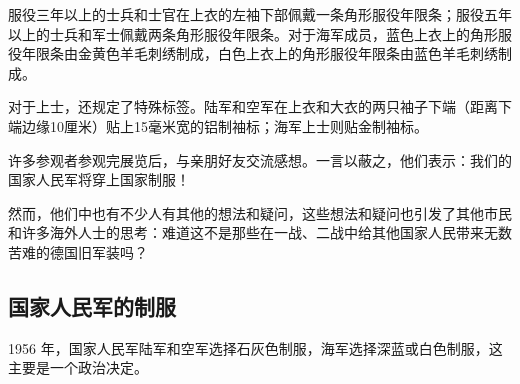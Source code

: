 服役三年以上的士兵和士官在上衣的左袖下部佩戴一条角形服役年限条；服役五年以上的士兵和军士佩戴两条角形服役年限条。对于海军成员，蓝色上衣上的角形服役年限条由金黄色羊毛刺绣制成，白色上衣上的角形服役年限条由蓝色羊毛刺绣制成。

对于上士，还规定了特殊标签。陆军和空军在上衣和大衣的两只袖子下端（距离下端边缘10厘米）贴上15毫米宽的铝制袖标；海军上士则贴金制袖标。

许多参观者参观完展览后，与亲朋好友交流感想。一言以蔽之，他们表示：我们的国家人民军将穿上国家制服！

然而，他们中也有不少人有其他的想法和疑问，这些想法和疑问也引发了其他市民和许多海外人士的思考：难道这不是那些在一战、二战中给其他国家人民带来无数苦难的德国旧军装吗？

\subsection{国家人民军的制服}

1956 年，国家人民军陆军和空军选择石灰色制服，海军选择深蓝或白色制服，这主要是一个政治决定。

